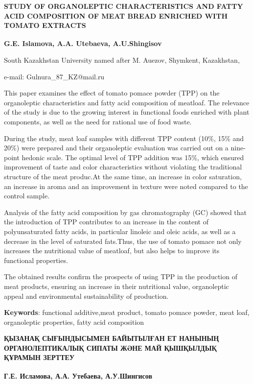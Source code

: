 \begin{articleheader}
{\bfseries STUDY OF ORGANOLEPTIC CHARACTERISTICS AND FATTY ACID COMPOSITION
OF MEAT BREAD ENRICHED WITH TOMATO EXTRACTS}

{\bfseries
G.E. Islamova\textsuperscript{\envelope },
A.A. Utebaeva,
A.U.Shingisov
}
\end{articleheader}

\begin{affiliation}
South Kazakhstan University named after M. Auezov, Shymkent, Kazakhstan,

e-mail: Gulnura\_87\_KZ@mail.ru
\end{affiliation}

This paper examines the effect of tomato pomace powder (TPP) on the
organoleptic characteristics and fatty acid composition of meatloaf. The
relevance of the study is due to the growing interest in functional
foods enriched with plant components, as well as the need for rational
use of food waste.

During the study, meat loaf samples with different TPP content (10\%,
15\% and 20\%) were prepared and their organoleptic evaluation was
carried out on a nine-point hedonic scale. The optimal level of TPP
addition was 15\%, which ensured improvement of taste and color
characteristics without violating the traditional structure of the meat
produc.At the same time, an increase in color saturation, an increase in
aroma and an improvement in texture were noted compared to the control
sample.

Analysis of the fatty acid composition by gas chromatography (GC) showed
that the introduction of TPP contributes to an increase in the content
of polyunsaturated fatty acids, in particular linoleic and oleic acids,
as well as a decrease in the level of saturated fats.Thus, the use of
tomato pomace not only increases the nutritional value of meatloaf, but
also helps to improve its functional properties.

The obtained results confirm the prospects of using TPP in the
production of meat products, ensuring an increase in their nutritional
value, organoleptic appeal and environmental sustainability of
production.

{\bfseries Keywords}: functional additive,meat product, tomato pomace
powder, meat loaf, organoleptic properties, fatty acid composition

\begin{articleheader}
{\bfseries ҚЫЗАНАҚ СЫҒЫНДЫСЫМЕН БАЙЫТЫЛҒАН ЕТ НАНЫНЫҢ ОРГАНОЛЕПТИКАЛЫҚ СИПАТЫ ЖӘНЕ МАЙ ҚЫШҚЫЛДЫҚ ҚҰРАМЫН ЗЕРТТЕУ}

{\bfseries
Г.Е. Исламова\textsuperscript{\envelope },
А.А. Утебаева,
А.У.Шингисов
}
\end{articleheader}

